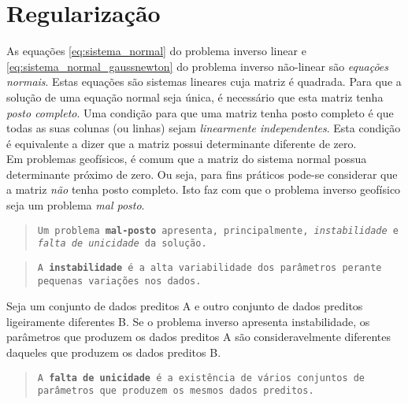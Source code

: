 \chapter{Regularização}

As equações \ref{eq:sistema_normal} do problema inverso linear e
\ref{eq:sistema_normal_gaussnewton} do problema inverso não-linear são
{\it equações normais}.
Estas equações são sistemas lineares cuja matriz é quadrada.
Para que a solução de uma equação normal seja única, é necessário que esta
matriz tenha {\it posto completo}.
Uma condição para que uma matriz tenha posto completo é que todas as suas colunas
(ou linhas) sejam {\it linearmente independentes}.
Esta condição é equivalente a dizer que a matriz possui determinante diferente de
zero.
\\
\indent Em problemas geofísicos, é comum que a matriz do sistema normal possua
determinante próximo de zero. Ou seja, para fins práticos pode-se considerar que
a matriz {\it não} tenha posto completo.
Isto faz com que o problema inverso geofísico seja um problema {\it mal posto}.

\begin{quote}
{\tt Um problema {\bf mal-posto} apresenta, principalmente, {\it instabilidade}
e {\it falta de unicidade} da solução.}
\end{quote}

\begin{quote}
{\tt A {\bf instabilidade} é a alta variabilidade dos parâmetros perante
peque\-nas variações nos dados.}
\end{quote}

\begin{example}
Seja um conjunto de dados preditos A e outro conjunto de
dados preditos ligeiramente diferentes B.
Se o problema inverso apresenta instabilidade, os pa\-râ\-me\-tros que produzem os
dados preditos A são consideravelmente diferentes daqueles que produzem os dados
preditos B.
\end{example}

\begin{quote}
{\tt A {\bf falta de unicidade} é a existência de vários conjuntos de parâme\-tros
que produzem os mesmos dados preditos.}
\end{quote}

